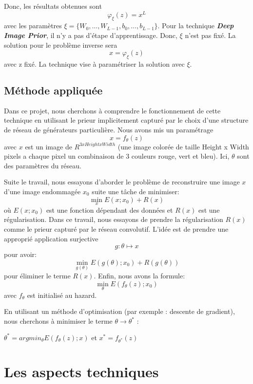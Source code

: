 \documentclass[
  11pt,
  dvipsnames]{article}
\begin{document}
Donc, les résultats obtenues sont \[\varphi_\xi(z) = x^L\] avec les paramètres \(\xi = \{W_0,...,W_{L-1},b_0,...,b_{L-1}\}\).
Pour la technique \textbf{\emph{Deep Image Prior}}, il n'y a pas d'étape d'apprentissage. Donc, \(\xi\) n'est pas fixé.
La solution pour le problème inverse sera \[x=\varphi_\xi(z)\] avec z fixé. La technique vise à paramétriser la solution avec \(\xi\).

\hypertarget{muxe9thode-appliquuxe9e}{%
\subsection{Méthode appliquée}\label{muxe9thode-appliquuxe9e}}

Dans ce projet, nous cherchons à comprendre le fonctionnement de cette technique
en utilisant le prieur implicitement capturé par le choix d'une structure de réseau de générateurs particulière.
Nous avons mis un paramétrage \[x = f_\theta(z)\] avec \(x\) est un image de \(R^{3xHeightxWidth}\) (une image colorée de taille
Height x Width pixels a chaque pixel un combinaison de 3 couleurs rouge, vert et bleu).
Ici, \(\theta\) sont des paramètres du réseau.

Suite le travail, nous essayons d'aborder le problème de reconstruire une image \(x\) d'une image endommagée \(x_0\) suite une tâche de minimiser: \[\min_{x} E(x;x_0) + R(x)\] où \(E(x;x_0)\) est une fonction dépendant des données et \(R(x)\) est une régularisation. Dans ce travail, nous essayons de prendre la régularisation \(R(x)\) comme le prieur capturé par le réseau convolutif. L'idée est de prendre une approprié application surjective \[g: \theta \mapsto x\] pour avoir: \[\min_{g(\theta)} E(g(\theta);x_0) + R(g(\theta))\] pour éliminer le terme \(R(x)\). Enfin, nous avons la formule: \[\min_{\theta} E(f_{\theta}(z);x_0)\] avec \(f_{\theta}\) est initialisé au hazard.

En utilisant un méthode d'optimisation (par exemple : descente de gradient), nous cherchons à minimiser le terme \(\theta \rightarrow \theta^*\) :

\begin {center} $\theta ^* = argmin_{\theta} E(f_{\theta}(z);x)$ et $x^* = f_{\theta^*}(z)$ \end {center}

\newpage

\hypertarget{les-aspects-techniques}{%
\section{Les aspects techniques}\label{les-aspects-techniques}}
\end{document}

